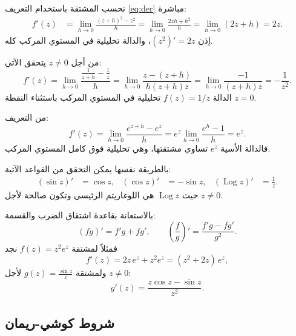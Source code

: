 \begin{example}[مشتقة $f(z) = z^2$]
نحسب المشتقة باستخدام التعريف \eqref{eq:der} مباشرة:
\begin{align*}
  f'(z) &= \lim_{h \to 0} \frac{(z+h)^2 - z^2}{h}
       = \lim_{h \to 0} \frac{2zh + h^2}{h}
       = \lim_{h \to 0} (2z + h) = 2z.
\end{align*}
إذن $(z^2)' = 2z$، والدالة تحليلية في المستوي المركب كله.
\end{example}

\begin{example}[مشتقة $f(z) = \dfrac{1}{z}$]
من أجل $z \neq 0$ يتحقق الآتي:
\[
  f'(z) = \lim_{h \to 0} \frac{\frac{1}{z+h} - \frac{1}{z}}{h}
        = \lim_{h \to 0} \frac{z - (z+h)}{h(z+h)z}
        = \lim_{h \to 0} \frac{-1}{(z+h)z}
        = -\frac{1}{z^2}.
\]
الدالة $f(z) = 1/z$ تحليلية في المستوي المركب باستثناء النقطة $z = 0$.
\end{example}

\begin{example}
من التعريف:
\[
  f'(z) = \lim_{h \to 0} \frac{e^{z+h} - e^z}{h}
        = e^z \lim_{h \to 0} \frac{e^{h} - 1}{h}
        = e^z.
\]
فالدالة الأسية $e^z$ تساوي مشتقتها، وهي تحليلية فوق كامل المستوي المركب.
\end{example}

\begin{example}
بالطريقة نفسها يمكن التحقق من القواعد الآتية:
\begin{align*}
  (\sin z)' &= \cos z, & (\cos z)' &= -\sin z, & (\operatorname{Log} z)' &= \frac{1}{z}.
\end{align*}
حيث $\operatorname{Log} z$ هي اللوغاريتم الرئيسي وتكون صالحة لأجل $z \neq 0$.
\end{example}

\begin{example}
بالاستعانة بقاعدة اشتقاق الضرب والقسمة:
\[
  (f g)' = f' g + f g', \qquad \left(\frac{f}{g}\right)' = \frac{f' g - f g'}{g^2}.
\]
فمثلاً لمشتقة $f(z) = z^2 e^z$ نجد
\[
  f'(z) = 2z\, e^z + z^2 e^z = (z^2 + 2z)\, e^z,
\]
ولمشتقة $g(z) = \frac{\sin z}{z}$ لأجل $z \neq 0$:
\[
  g'(z) = \frac{z\cos z - \sin z}{z^2}.
\]
\end{example}

\subsection{شروط كوشي-ريمان}

